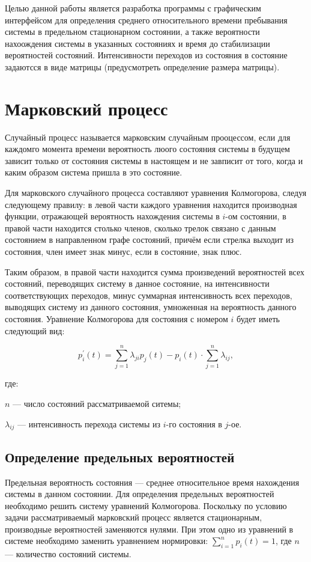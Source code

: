  Целью данной работы является разработка программы с графическим интерфейсом для определения среднего относительного времени пребывания системы в предельном стационарном состоянии, а также вероятности нахоождения системы в указанных состояниях и время до стабилизации вероятностей состояний. Интенсивности переходов из состояния в состояние задаютсся в виде матрицы (предусмотреть определение размера матрицы).

\section*{Марковский процесс}
	
Случайный процесс называется марковским случайным прооцессом, если для каждомго момента времени вероятность люого состояния системы в будущем зависит только от состояния системы в настоящем и не завписит от того, когда и каким образом система пришла в это состояние.

Для марковского случайного процесса составляют уравнения Колмогорова, следуя следующему правилу: в левой части каждого уравнения находится производная функции, отражающей вероятность нахождения системы в $i$-ом состоянии, в правой части находится столько членов, сколько трелок связано с данным состоянием в направленном графе состояний, причём если стрелка выходит из состояния, член имеет знак минус, если в состояние, знак плюс. 

Таким образом, в правой части находится сумма произведений вероятностей всех состояний, переводящих систему в данное состояние, на интенсивности соответствующих переходов, минус суммарная интенсивность всех переходов, выводящих систему из данного состояния, умноженная на вероятность данного состояния. Уравнение Колмогорова для состояния с номером $i$ будет иметь следующий вид:

\begin{equation}
	p^{'}_{i}(t) = \sum_{j=1}^{n}\lambda_{ji}p_{j}(t) - p_{i}(t)\cdot \sum_{j=1}^{n}\lambda_{ij},
\end{equation}

где:

 $n$ --- число состояний рассматриваемой ситемы;

$\lambda_{ij}$ --- интенсивность перехода системы из $i$-го состояния в $j$-ое.


\subsection*{Определение предельных вероятностей}
Предельная вероятность состояния --- среднее относительное время нахождения системы в данном состоянии.
Для определения предельных вероятностей необходимо решить систему уравнений Колмогорова. 
Поскольку по условию задачи рассматриваемый марковский процесс является стационарным, производные вероятностей заменяются нулями. 
При этом одно из уравнений в системе необходимо заменить уравнением нормировки: $\sum_{i = 1}^{n}p_{i}(t) = 1$, где $n$ --- количество состояний системы.


